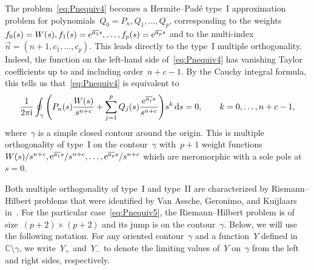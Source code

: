 \documentclass[pdftex]{sigma}
\numberwithin{equation}{section}
\newcommand*{\Cset}{\mathbb{C}} %
\begin{document}
 The problem~\eqref{eq:Pnequiv4} becomes a Hermite--Pad\'{e} type~I approximation problem
 for polynomials~$Q_0=P_n, Q_1, \dots, Q_p$, corresponding
 to the weights~$f_0(s)=W(s),f_1(s)={\rm e}^{\overline{a_1}s}, \dots, f_p(s)={\rm e}^{\overline{a_p}s}$
 and to the multi-index $\vec{n} = (n+1,c_1,\dots,c_p)$.
 This leads directly to the type~I multiple orthogonality. Indeed, the function on the
 left-hand side of~\eqref{eq:Pnequiv4} has vanishing Taylor coefficients up to and
 including order~$n+c-1$. By the Cauchy integral formula, this tells us that~\eqref{eq:Pnequiv4} is equivalent to
 \begin{equation}
 \label{eq:Pnequiv5}
 \frac{1}{2\pi {\rm i}} \oint_\gamma \Bigg(P_n(s) \frac{W(s)}{s^{n+c}} + \sum_{j=1}^p Q_j(s) \frac{{\rm e}^{\overline{a_j} s}}{s^{n+c}}\Bigg) s^k\, {\rm d}s = 0,
 \qquad k=0, \dots, n+c-1,
 \end{equation}
 where~$\gamma$ is a simple closed contour around the origin. This is multiple orthogonality of type~I on the contour~$\gamma$ with~$p+1$ weight functions~$W(s)/s^{n+c}, {\rm e}^{\overline{a_1}s}/s^{n+c}, \dots, {\rm e}^{\overline{a_p}s}/s^{n+c}$ which are meromorphic with a sole pole at~$s=0$.

 Both multiple orthogonality of type~I and type~II are characterized by Riemann--Hilbert problems that were identified by Van Assche, Geronimo, and Kuijlaars in~\cite{VAGK}. For the particular case~\eqref{eq:Pnequiv5}, the Riemann--Hilbert problem is of size~$(p+2) \times (p+2)$ and its jump is on the contour~$\gamma$. Below, we will use the following notation. For any oriented contour~$\gamma$ and a function~$Y$ defined in~$\Cset \setminus \gamma$, we write~$Y_+$ and~$Y_-$ to denote the limiting values of~$Y$ on~$\gamma$ from the left and right sides, respectively.
\end{document}
